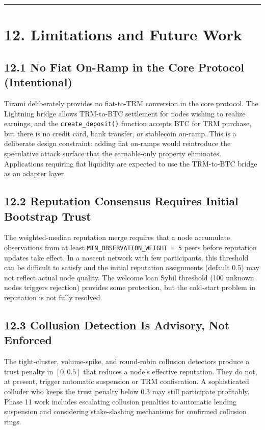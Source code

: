 \documentclass[
  11pt,
]{article}
\begin{document}
\begin{center}\rule{0.5\linewidth}{0.5pt}\end{center}

\section{12. Limitations and Future
Work}\label{limitations-and-future-work}

\subsection{12.1 No Fiat On-Ramp in the Core Protocol
(Intentional)}\label{no-fiat-on-ramp-in-the-core-protocol-intentional}

Tirami deliberately provides no fiat-to-TRM conversion in the core
protocol. The Lightning bridge allows TRM-to-BTC settlement for nodes
wishing to realize earnings, and the \texttt{create\_deposit()} function
accepts BTC for TRM purchase, but there is no credit card, bank
transfer, or stablecoin on-ramp. This is a deliberate design constraint:
adding fiat on-ramps would reintroduce the speculative attack surface
that the earnable-only property eliminates. Applications requiring fiat
liquidity are expected to use the TRM-to-BTC bridge as an adapter layer.

\subsection{12.2 Reputation Consensus Requires Initial Bootstrap
Trust}\label{reputation-consensus-requires-initial-bootstrap-trust}

The weighted-median reputation merge requires that a node accumulate
observations from at least \texttt{MIN\_OBSERVATION\_WEIGHT\ =\ 5} peers
before reputation updates take effect. In a nascent network with few
participants, this threshold can be difficult to satisfy and the initial
reputation assignments (default 0.5) may not reflect actual node
quality. The welcome loan Sybil threshold (100 unknown nodes triggers
rejection) provides some protection, but the cold-start problem in
reputation is not fully resolved.

\subsection{12.3 Collusion Detection Is Advisory, Not
Enforced}\label{collusion-detection-is-advisory-not-enforced}

The tight-cluster, volume-spike, and round-robin collusion detectors
produce a trust penalty in \([0, 0.5]\) that reduces a node's effective
reputation. They do not, at present, trigger automatic suspension or TRM
confiscation. A sophisticated colluder who keeps the trust penalty below
0.3 may still participate profitably. Phase 11 work includes escalating
collusion penalties to automatic lending suspension and considering
stake-slashing mechanisms for confirmed collusion rings.
\end{document}
